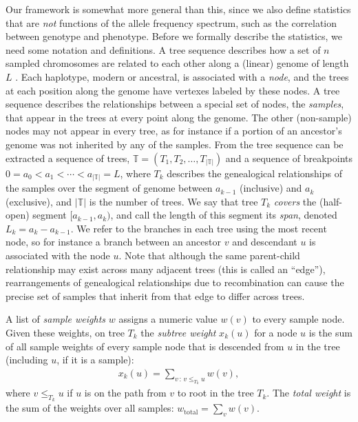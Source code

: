 \documentclass{article}
\newcommand{\treeseq}{\mathbb{T}} %
\newcommand{\iw}{w} %
\newcommand{\tiw}{w_\text{total}} %
\newcommand{\nw}{x} %
\begin{document}
Our framework is somewhat more general than this, since we also define statistics that are
\emph{not} functions of the allele frequency spectrum,
such as the correlation between genotype and phenotype.
Before we formally describe the statistics, we need some notation and definitions.
A tree sequence describes how a set of $n$ sampled chromosomes
are related to each other along a (linear) genome of length $L$ \citep{kelleher2016efficient,kelleher2018efficient}.
Each haplotype, modern or ancestral, is associated with a \emph{node},
and the trees at each position along the genome have vertexes labeled by these nodes.
A tree sequence describes the relationships between a special set of nodes, the \emph{samples},
that appear in the trees at every point along the genome.
The other (non-sample) nodes may not appear in every tree,
as for instance if a portion of an ancestor's genome was not inherited by any of the samples.
From the tree sequence can be extracted a sequence of trees,
$\treeseq = (T_1, T_2, \ldots, T_{|\treeseq|})$
and a sequence of breakpoints $0 = a_0 < a_1 < \cdots < a_{|\treeseq|} = L$,
where $T_k$ describes the genealogical relationships of the samples
over the segment of genome between $a_{k-1}$ (inclusive) and $a_k$ (exclusive),
and $|\treeseq|$ is the number of trees.
We say that tree $T_k$ \emph{covers} the (half-open) segment $[a_{k-1}, a_k)$,
and call the length of this segment its \emph{span}, denoted $L_k = a_k - a_{k-1}$.
We refer to the branches in each tree using the most recent node,
so for instance a branch between an ancestor $v$ and descendant $u$
is associated with the node $u$.
Note that although the same parent-child relationship may exist across many adjacent trees
(this is called an ``edge''),
rearrangements of genealogical relationships due to recombination
can cause the precise set of samples that inherit from that edge to differ across trees.

\begin{definition} \label{defn:weights}
    A list of \emph{sample weights} $\iw$ assigns a numeric value $\iw(v)$
    to every sample node.
    Given these weights, on tree $T_k$
    the \emph{subtree weight} $\nw_k(u)$
    for a node $u$ is the sum of all sample weights
    of every sample node that is descended from $u$ in the tree (including $u$, if it is a sample):
    \begin{align*}
        \nw_k(u) = \sum_{v \,:\, v \le_{T_k} u} \iw(v) ,
    \end{align*}
    where $v \le_{T_k} u$ if $u$ is on the path from $v$ to root in the tree $T_k$.
    The \emph{total weight} is the sum of the weights over all samples:
    $\tiw = \sum_v \iw(v)$.
\end{definition}
\end{document}
